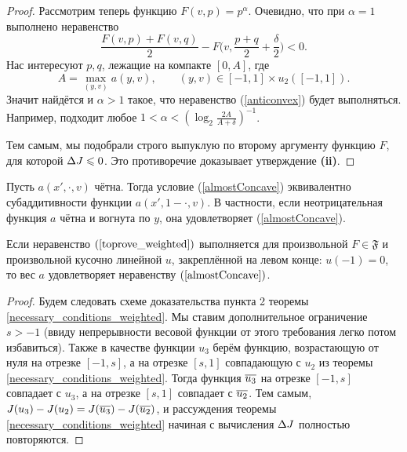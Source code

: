 \begin{proof}
Рассмотрим теперь функцию $F(v, p) = p^\alpha$.
Очевидно, что при $\alpha = 1$ выполнено неравенство
\begin{equation}
\label{anticonvex}
\frac{F(v, p) + F(v, q)}{ 2 } - F \bigl( v, \frac{p + q}{ 2 } + \frac{\delta}{ 2 } \bigr) < 0.
\end{equation}
Нас интересуют $p, q$, лежащие на компакте $[0, A]$, где
\begin{equation*}
A = \max \limits_{(y, v)} a(y, v), \qquad (y, v) \in [-1, 1 ] \times u_2([-1, 1] ).
\end{equation*}
Значит найдётся и $\alpha > 1$ такое, что неравенство (\ref{anticonvex}) будет выполняться.
Например, подходит любое $1 < \alpha < ( \log_2 \frac{2 A}{A + \delta} )^{-1}$.

Тем самым, мы подобрали строго выпуклую по второму аргументу функцию $F$, для которой $\Delta J \leqslant 0$.
Это противоречие доказывает утверждение \textbf{(ii)}.
\end{proof}

\begin{rem}
Пусть $a(x', \cdot, v)$ чётна.
Тогда условие (\ref{almostConcave}) эквивалентно субаддитивности функции $a(x', 1 - \cdot, v)$.
В частности, если неотрицательная функция $a$ чётна и вогнута по $y$, она удовлетворяет (\ref{almostConcave}).
\end{rem}

\begin{thm}
\label{landesNecessaryRem}
Если неравенство $(\ref{toprove_weighted})$ выполняется для произвольной $F \in \mathfrak{F}$
и произвольной кусочно линейной $u$, закреплённой на левом конце: $u( -1 ) = 0$,
то вес $a$ удовлетворяет неравенству $(\ref{almostConcave})$.
\end{thm}

\begin{proof}
Будем следовать схеме доказательства пункта 2 теоремы \ref{necessary_conditions_weighted}.
Мы ставим дополнительное ограничение $s > -1$
(ввиду непрерывности весовой функции от этого требования легко потом избавиться).
Также в качестве функции $u_3$ берём функцию, возрастающую от нуля на отрезке $[-1, s]$,
а на отрезке $[s, 1]$ совпадающую с $u_2$ из теоремы \ref{necessary_conditions_weighted}.
Тогда функция $\mon{u_3}$ на отрезке $[-1, s]$ совпадает с $u_3$, а на отрезке $[s, 1]$ совпадает с $\mon{u_2}$.
Тем самым, $\IWg(u_3) - \IWg(u_2) = \IWg(\mon{u_3}) - \IWg(\mon{u_2})$,
и рассуждения теоремы \ref{necessary_conditions_weighted} начиная с вычисления $\Delta J$ полностью повторяются.
\end{proof}
